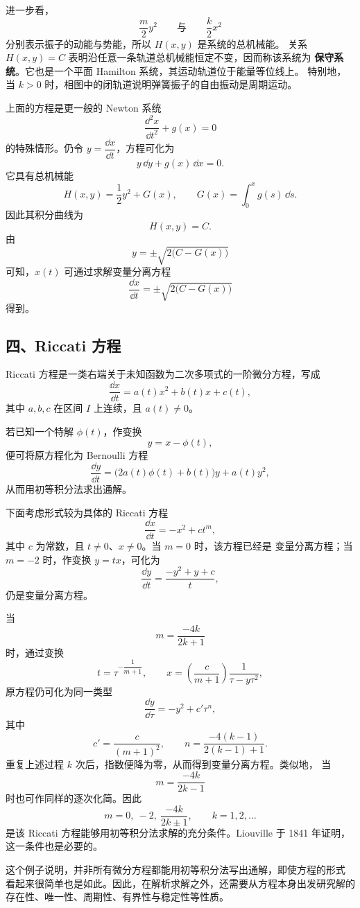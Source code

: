 进一步看，
\[
	\dfrac{m}{2}y^2
	\qquad\text{与}\qquad
	\dfrac{k}{2}x^2
\]
分别表示振子的动能与势能，所以 $H(x,y)$ 是系统的总机械能。
关系 $H(x,y)=C$ 表明沿任意一条轨道总机械能恒定不变，因而称该系统为
\textbf{保守系统}。它也是一个平面 Hamilton 系统，其运动轨道位于能量等位线上。
特别地，当 $k>0$ 时，相图中的闭轨道说明弹簧振子的自由振动是周期运动。

上面的方程是更一般的 Newton 系统
\[
	\dfrac{\dd^2x}{\dd t^2}+g(x)=0
\]
的特殊情形。仍令 $y=\dfrac{\dd x}{\dd t}$，方程可化为
\[
	y\,\dd y+g(x)\,\dd x=0.
\]
它具有总机械能
\[
	H(x,y)=\dfrac{1}{2}y^2+G(x),
	\qquad
	G(x)=\int_0^x g(s)\,\dd s.
\]
因此其积分曲线为
\[
	H(x,y)=C.
\]
由
\[
	y=\pm\sqrt{2\bigl(C-G(x)\bigr)}
\]
可知，$x(t)$ 可通过求解变量分离方程
\[
	\dfrac{\dd x}{\dd t}
	=\pm\sqrt{2\bigl(C-G(x)\bigr)}
\]
得到。

\subsection*{四、Riccati 方程}

\begin{definition}\label{def:Riccati方程}
	Riccati 方程是一类右端关于未知函数为二次多项式的一阶微分方程，写成
\[
	\dfrac{\dd x}{\dd t}
	=a(t)x^2+b(t)x+c(t),
\]
其中 $a,b,c$ 在区间 $I$ 上连续，且 $a(t)\neq 0$。
\end{definition}
若已知一个特解
$\phi(t)$，作变换
\[
	y=x-\phi(t),
\]
便可将原方程化为 Bernoulli 方程
\[
	\dfrac{\dd y}{\dd t}
	=\bigl(2a(t)\phi(t)+b(t)\bigr)y+a(t)y^2,
\]
从而用初等积分法求出通解。

下面考虑形式较为具体的 Riccati 方程
\[
	\dfrac{\dd x}{\dd t}=-x^2+ct^m,
\]
其中 $c$ 为常数，且 $t\neq 0$、$x\neq 0$。当 $m=0$ 时，该方程已经是
变量分离方程；当 $m=-2$ 时，作变换 $y=tx$，可化为
\[
	\dfrac{\dd y}{\dd t}
	=\dfrac{-y^2+y+c}{t},
\]
仍是变量分离方程。

当
\[
	m=\dfrac{-4k}{2k+1}
\]
时，通过变换
\[
	t=\tau^{-\dfrac{1}{m+1}},
	\qquad
	x=\left(\dfrac{c}{m+1}\right)
	\dfrac{1}{\tau-y\tau^2},
\]
原方程仍可化为同一类型
\[
	\dfrac{\dd y}{\dd\tau}
	=-y^2+c'\tau^n,
\]
其中
\[
	c'=\dfrac{c}{(m+1)^2},
	\qquad
	n=\dfrac{-4(k-1)}{2(k-1)+1}.
\]
重复上述过程 $k$ 次后，指数便降为零，从而得到变量分离方程。类似地，
当
\[
	m=\dfrac{-4k}{2k-1}
\]
时也可作同样的逐次化简。因此
\[
	m=0,\ -2,\ \dfrac{-4k}{2k\pm 1},
	\qquad k=1,2,\ldots
\]
是该 Riccati 方程能够用初等积分法求解的充分条件。Liouville 于 1841 年证明，
这一条件也是必要的。

这个例子说明，并非所有微分方程都能用初等积分法写出通解，即使方程的形式
看起来很简单也是如此。因此，在解析求解之外，还需要从方程本身出发研究解的
存在性、唯一性、周期性、有界性与稳定性等性质。
